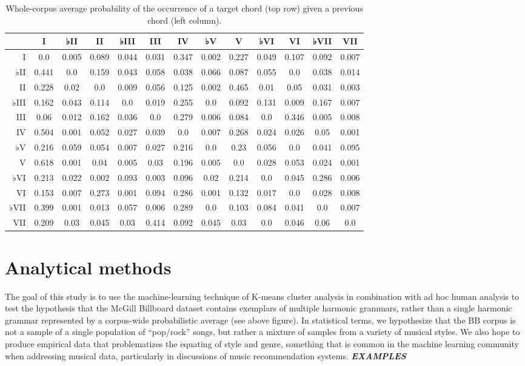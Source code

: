 \begin{table}[htbp]
\begin{minipage}{\linewidth}
\setlength{\tymax}{0.5\linewidth}
\centering
\small
\caption{Whole-corpus average probability of the occurrence of a target chord (top row) given a previous chord (left column).}
\label{whole-corpusaverageprobabilityoftheoccurrenceofatargetchordtoprowgivenapreviouschordleftcolumn.}
\begin{tabulary}{\textwidth}{@{}RCCCCCCCCCCCC@{}} \toprule
&I&♭II&II&♭III&III&IV&♭V&V&♭VI&VI&♭VII&VII\\
\midrule
I&0.0&0.005&0.089&0.044&0.031&0.347&0.002&0.227&0.049&0.107&0.092&0.007\\
♭II&0.441&0.0&0.159&0.043&0.058&0.038&0.066&0.087&0.055&0.0&0.038&0.014\\
II&0.228&0.02&0.0&0.009&0.056&0.125&0.002&0.465&0.01&0.05&0.031&0.003\\
♭III&0.162&0.043&0.114&0.0&0.019&0.255&0.0&0.092&0.131&0.009&0.167&0.007\\
III&0.06&0.012&0.162&0.036&0.0&0.279&0.006&0.084&0.0&0.346&0.005&0.008\\
IV&0.504&0.001&0.052&0.027&0.039&0.0&0.007&0.268&0.024&0.026&0.05&0.001\\
♭V&0.216&0.059&0.054&0.007&0.027&0.216&0.0&0.23&0.056&0.0&0.041&0.095\\
V&0.618&0.001&0.04&0.005&0.03&0.196&0.005&0.0&0.028&0.053&0.024&0.001\\
♭VI&0.213&0.022&0.002&0.093&0.003&0.096&0.02&0.214&0.0&0.045&0.286&0.006\\
VI&0.153&0.007&0.273&0.001&0.094&0.286&0.001&0.132&0.017&0.0&0.028&0.008\\
♭VII&0.399&0.001&0.013&0.057&0.006&0.289&0.0&0.103&0.084&0.041&0.0&0.007\\
VII&0.209&0.03&0.045&0.03&0.414&0.092&0.045&0.03&0.0&0.046&0.06&0.0\\

\bottomrule

\end{tabulary}
\end{minipage}
\end{table}

\chapter{Analytical methods}
\label{analyticalmethods}

The goal of this study is to use the machine-learning technique of K-means cluster analysis in combination with ad hoc human analysis to test the hypothesis that the McGill Billboard dataset contains exemplars of multiple harmonic grammars, rather than a single harmonic grammar represented by a corpus-wide probabilistic average (see above figure). In statistical terms, we hypothesize that the BB corpus is not a sample of a single population of ``pop\slash rock'' songs, but rather a mixture of samples from a variety of musical styles. We also hope to produce empirical data that problematizes the equating of style and genre, something that is common in the machine learning community when addressing musical data, particularly in discussions of music recommendation systems. \textbf{\emph{EXAMPLES}}

